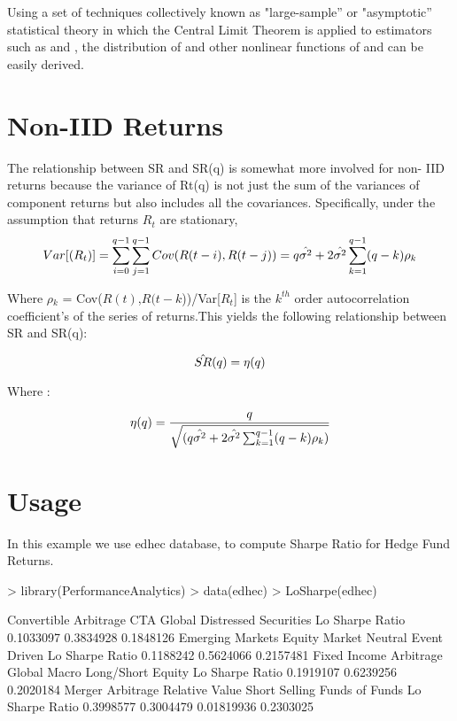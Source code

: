 \documentclass[12pt,letterpaper,english]{article}
\begin{document}
Using a set of techniques collectively known as "large-sample'' or "asymptotic'' statistical theory in which the Central Limit Theorem is applied to
estimators such as and , the distribution of and other nonlinear functions of and can be easily derived.

\section{Non-IID Returns}
The relationship between SR and SR(q) is somewhat more involved for non-
IID returns because the variance of Rt(q) is not just the sum of the variances of component returns but also includes all the covariances. Specifically, under
the assumption that returns \(R_t\) are stationary,
\begin{equation}
Var[(R_t)] =   \sum_{i=0}^{q-1} \sum_{j=1}^{q-1} Cov(R(t-i),R(t-j)) = q\hat{\sigma^2} + 2\hat{\sigma^2} \sum_{k=1}^{q-1} (q-k)\rho_k \\
\end{equation}

Where  $\rho$\(_k\) = Cov(\(R(t)\),\(R(t-k\)))/Var[\(R_t\)] is the \(k^{th}\) order autocorrelation coefficient's of the series of returns.This yields the following relationship between SR and SR(q):

\begin{equation}
\hat{SR}(q)  =  \eta(q) \\
\end{equation}

Where :

\begin{equation}
\eta(q)  =  \frac{q}{\sqrt{(q\hat{\sigma^2} + 2\hat{\sigma^2} \sum_{k=1}^{q-1} (q-k)\rho_k)}} \\
\end{equation}

\section{Usage}

In this example we use edhec database, to compute Sharpe Ratio for Hedge Fund Returns.
\begin{Schunk}
\begin{Sinput}
> library(PerformanceAnalytics)
> data(edhec)
> LoSharpe(edhec)
\end{Sinput}
\begin{Soutput}
                Convertible Arbitrage CTA Global Distressed Securities
Lo Sharpe Ratio             0.1033097  0.3834928             0.1848126
                Emerging Markets Equity Market Neutral Event Driven
Lo Sharpe Ratio        0.1188242             0.5624066    0.2157481
                Fixed Income Arbitrage Global Macro Long/Short Equity
Lo Sharpe Ratio              0.1919107    0.6239256         0.2020184
                Merger Arbitrage Relative Value Short Selling Funds of Funds
Lo Sharpe Ratio        0.3998577      0.3004479    0.01819936      0.2303025
\end{Soutput}
\end{Schunk}
\end{document}
